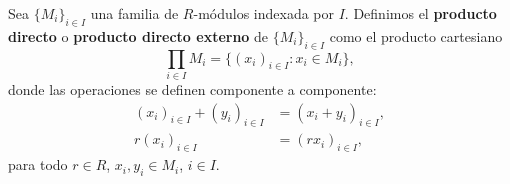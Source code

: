%
%

\begin{definicion}
	Sea $\{M_{i}\}_{i \in I}$ una familia de $R$-módulos indexada por $I$.
	Definimos el \textbf{producto directo} o \textbf{producto directo externo} de
	$\{M_{i}\}_{i \in I}$ como el producto cartesiano
	\[
	\prod_{i \in I}M_{i}= \{(x_{i})_{i \in I}: x_{i}\in M_{i}\},
	\]
	donde las operaciones se definen componente a componente:
	\begin{align*}
		(x_{i})_{i \in I}+ (y_{i})_{i \in I} & = (x_{i}+y_{i})_{i \in I}, \\
		r(x_{i})_{i \in I}                   & = (rx_{i})_{i \in I},
	\end{align*}
	para todo $r \in R$, $x_{i},y_{i}\in M_{i}$, $i \in I$.
\end{definicion}

